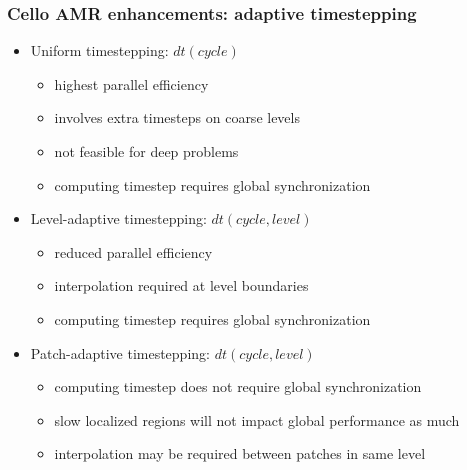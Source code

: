 \begin{frame}[fragile] 
\frametitle{Cello AMR enhancements: adaptive timestepping}
\begin{itemize}
\item Uniform timestepping: $dt(cycle)$
\begin{itemize}
\item   highest parallel efficiency
\item   involves extra timesteps on coarse levels
\item   not feasible for deep problems
\item   computing timestep requires global synchronization
\end{itemize}
\item Level-adaptive timestepping: $dt(cycle,level)$
\begin{itemize}
\item   reduced parallel efficiency 
\item   interpolation required at level boundaries
\item   computing timestep requires global synchronization
\end{itemize}
\item Patch-adaptive timestepping: $dt(cycle,level)$
\begin{itemize}
\item   computing timestep does not require global synchronization
\item   slow localized regions will not impact global performance as much
\item   interpolation may be required between patches in same level
\end{itemize}
\end{itemize}
\end{frame}

